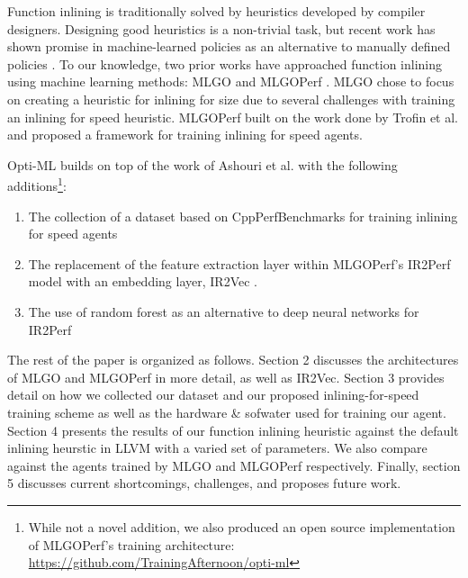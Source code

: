 \documentclass[nohyperref]{article}
\theoremstyle{plain}
\theoremstyle{definition}
\theoremstyle{remark}
\begin{document}
Function inlining is traditionally solved by heuristics developed by compiler designers. Designing good heuristics is a non-trivial task, but recent work has shown promise in machine-learned policies as an alternative to manually defined policies \cite{mlgo}. To our knowledge, two prior works have approached function inlining using machine learning methods: MLGO \cite{mlgo} and MLGOPerf \cite{mlgoperf}. MLGO chose to focus on creating a heuristic for inlining for size due to several challenges with training an inlining for speed heuristic. MLGOPerf built on the work done by Trofin et al. and proposed a framework for training inlining for speed agents.

Opti-ML builds on top of the work of Ashouri et al. with the following additions\footnote{While not a novel addition, we also produced an open source implementation of MLGOPerf's training architecture: \href{https://github.com/TrainingAfternoon/opti-ml}{https://github.com/TrainingAfternoon/opti-ml}}:
\begin{enumerate}
    \item The collection of a dataset based on CppPerfBenchmarks \cite{cpp-perf-benchmarks} for training inlining for speed agents
    \item The replacement of the feature extraction layer within MLGOPerf's IR2Perf model with an embedding layer, IR2Vec \cite{ir2vec}. %
    \item The use of random forest as an alternative to deep neural networks for IR2Perf
\end{enumerate}

The rest of the paper is organized as follows. Section 2 discusses the architectures of MLGO and MLGOPerf in more detail, as well as IR2Vec. Section 3 provides detail on how we collected our dataset and our proposed inlining-for-speed training scheme as well as the hardware \& sofwater used for training our agent. Section 4 presents the results of our function inlining heuristic against the default inlining heurstic in LLVM with a varied set of parameters. We also compare against the agents trained by MLGO and MLGOPerf respectively. Finally, section 5 discusses current shortcomings, challenges, and proposes future work.
\end{document}
